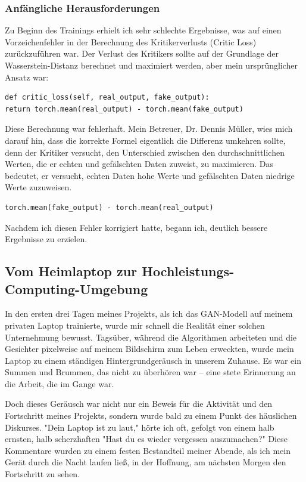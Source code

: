 \documentclass[a4paper, 12pt]{article}
\begin{document}
\subsubsection{Anfängliche Herausforderungen}
Zu Beginn des Trainings erhielt ich sehr schlechte Ergebnisse, was auf einen Vorzeichenfehler in der Berechnung des Kritikerverlusts (Critic Loss) zurückzuführen war. Der Verlust des Kritikers sollte auf der Grundlage der Wasserstein-Distanz berechnet und maximiert werden, aber mein ursprünglicher Ansatz war:

\begin{verbatim}
def critic_loss(self, real_output, fake_output):
return torch.mean(real_output) - torch.mean(fake_output)
\end{verbatim}

Diese Berechnung war fehlerhaft. Mein Betreuer, Dr. Dennis Müller, wies mich darauf hin, dass die korrekte Formel eigentlich die Differenz umkehren sollte, denn der Kritiker versucht, den Unterschied zwischen den durchschnittlichen Werten, die er echten und gefälschten Daten zuweist, zu maximieren. Das bedeutet, er versucht, echten Daten hohe Werte und gefälschten Daten niedrige Werte zuzuweisen.

\begin{verbatim}
torch.mean(fake_output) - torch.mean(real_output)
\end{verbatim}

Nachdem ich diesen Fehler korrigiert hatte, begann ich, deutlich bessere Ergebnisse zu erzielen.

\subsection{Vom Heimlaptop zur Hochleistungs-Computing-Umgebung}
In den ersten drei Tagen meines Projekts, als ich das GAN-Modell auf meinem privaten Laptop trainierte, wurde mir schnell die Realität einer solchen Unternehmung bewusst. Tagsüber, während die Algorithmen arbeiteten und die Gesichter pixelweise auf meinem Bildschirm zum Leben erweckten, wurde mein Laptop zu einem ständigen Hintergrundgeräusch in unserem Zuhause. Es war ein Summen und Brummen, das nicht zu überhören war – eine stete Erinnerung an die Arbeit, die im Gange war.

Doch dieses Geräusch war nicht nur ein Beweis für die Aktivität und den Fortschritt meines Projekts, sondern wurde bald zu einem Punkt des häuslichen Diskurses. "Dein Laptop ist zu laut," hörte ich oft, gefolgt von einem halb ernsten, halb scherzhaften "Hast du es wieder vergessen auszumachen?" Diese Kommentare wurden zu einem festen Bestandteil meiner Abende, als ich mein Gerät durch die Nacht laufen ließ, in der Hoffnung, am nächsten Morgen den Fortschritt zu sehen.
\end{document}
